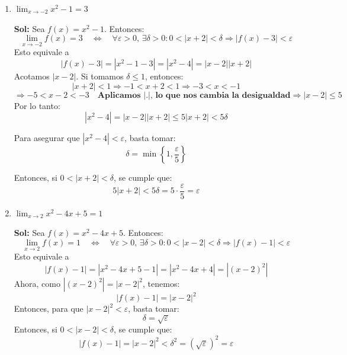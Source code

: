 \documentclass[letterpaper,12pt]{article}
\theoremstyle{plain}
\theoremstyle{definition}
\newcommand{\1}{\mathbbm{1}}
\let\epsilon\varepsilon
\begin{document}
\begin{enumerate}[label=\textbf{P\arabic*.}, itemsep=0cm]
\begin{enumerate}
        \item $\displaystyle \lim_{x \to -2} x^2 - 1 = 3$

\color{blue}
\textbf{Sol:} Sea \( f(x) = x^2 - 1 \). Entonces:
\[
\lim_{x \to -2} f(x) = 3
\quad \Leftrightarrow \quad
\forall \varepsilon > 0, \, \exists \delta > 0 : 
0 < |x + 2| < \delta \Rightarrow |f(x) - 3| < \varepsilon
\]
Esto equivale a
\[
|f(x) - 3| = |x^2 - 1 - 3| = |x^2 - 4| = |x - 2||x + 2|
\]
Acotamos \( |x - 2| \). Si tomamos \( \delta \leq 1 \), entonces:
\[
|x + 2| < 1 \Rightarrow -1<x+2<1 \Rightarrow -3 < x <-1 
\]
\[
\Rightarrow -5 < x -2 <-3 \quad \textbf{Aplicamos $|.|$, lo que nos cambia la desigualdad} 
\Rightarrow |x - 2| \leq 5
\]
Por lo tanto:
\[
|x^2 - 4| = |x - 2||x + 2| \leq 5|x + 2| < 5\delta
\]

Para asegurar que \( |x^2 - 4| < \varepsilon \), basta tomar:
\[
\delta = \min\left\{1, \frac{\varepsilon}{5}\right\}
\]

Entonces, si \( 0 < |x + 2| < \delta \), se cumple que:
\[
5|x + 2| < 5\delta =5 \cdot \frac{\epsilon}{5} = \epsilon 
\]
\color{black}

  
        \item $\displaystyle \lim_{x \to 2} x^2 - 4x + 5 = 1$

\color{blue}
\textbf{Sol:} Sea \( f(x) = x^2 - 4x + 5 \). Entonces:
\[
\lim_{x \to 2} f(x) = 1
\quad \Leftrightarrow \quad
\forall \varepsilon > 0, \, \exists \delta > 0 : 
0 < |x - 2| < \delta \Rightarrow |f(x) - 1| < \varepsilon
\]
Esto equivale a
\[
|f(x) - 1| = |x^2 - 4x + 5 - 1| = |x^2 - 4x + 4| = |(x - 2)^2|
\]
Ahora, como \( |(x - 2)^2| = |x - 2|^2 \), tenemos:
\[
|f(x) - 1| = |x - 2|^2
\]
Entonces, para que \( |x - 2|^2 < \varepsilon \), basta tomar:
\[
\delta = \sqrt{\varepsilon}
\]
Entonces, si \( 0 < |x - 2| < \delta \), se cumple que:
\[
|f(x) - 1| = |x - 2|^2 < \delta^2 = (\sqrt{\epsilon})^2 = \varepsilon
\]
\color{black}
        
\end{enumerate}
\end{enumerate}

\end{document}
